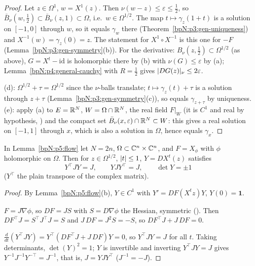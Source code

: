 \begin{proof}
\label{stepN:p5:fl-inverse} Let $z\in\Omega^1$, $w=X^1(z)$. Then $\nu(w-z)\le\varepsilon\le\frac12$, so $\bar B_\nu(w,\frac12)\subset\bar B_\nu(z,1)\subset\Omega$, i.e.\ $w\in\Omega^{1/2}$. The map $t\mapsto\gamma_z(1+t)$ is a solution on $[-1,0]$ through $w$, so it equals $\gamma_w$ there (Theorem~\ref{bpN:p3:gen-uniqueness}) and $X^{-1}(w)=\gamma_z(0)=z$. The statement for $X^1\circ X^{-1}$ is this one for $-F$ (Lemma~\ref{bpN:p3:gen-symmetry}(b)).
For the derivative: $B_\nu(z,\frac12)\subset\Omega^{1/2}$ (as above), $G=X^t-\mathrm{id}$ is holomorphic there by (b) with $\nu(G)\le\varepsilon$ by (a); Lemma~\ref{bpN:p4:general-cauchy} with $R=\frac12$ gives $\lvert DG(z)\rvert_\nu\le2\varepsilon$.

\label{stepN:p5:fl-symmetry} (d): $\Omega^{1/2}+\tau=\Omega^{1/2}$ since the $\nu$-balls translate; $t\mapsto\gamma_z(t)+\tau$ is a solution through $z+\tau$ (Lemma~\ref{bpN:p3:gen-symmetry}(c)), so equals $\gamma_{z+\tau}$ by uniqueness.
(e): apply (a) to $E=\mathbb{R}^N$, $W=\Omega\cap\mathbb{R}^N$, the real field $F|_W$ (it is $C^1$ and real by hypothesis, ) and the compact set $\bar B_\nu(x,\varepsilon)\cap\mathbb{R}^N\subset W$: this gives a real solution on $[-1,1]$ through $x$, which is also a solution in $\Omega$, hence equals $\gamma_x$.
\end{proof}

\begin{lemma}\label{bpN:p5:symplectic}
In Lemma~\ref{bpN:p5:flow} let $N=2n$, $\Omega\subset\mathbb{C}^n\times\mathbb{C}^n$, and $F=X_\phi$ with $\phi$ holomorphic on $\Omega$. Then for $z\in\Omega^{1/2}$, $\lvert t\rvert\le1$, $Y=D X^t(z)$ satisfies
\[Y^\top JY=J,\qquad YJY^\top=J,\qquad \det Y=\pm1\]
($Y^\top$ the plain transpose of the complex matrix).
\end{lemma}
\begin{proof}
\label{stepN:p5:sy-var} By Lemma~\ref{bpN:p5:flow}(b), $Y\in C^1$ with $Y'=DF(X^tz)Y$, $Y(0)=\mathbf 1$.

\label{stepN:p5:sy-field} $F=J\nabla\phi$, so $DF=JS$ with $S=D\nabla\phi$ the Hessian, symmetric (). Then $DF^\top J=S^\top J^\top J=S$ and $J\,DF=J^2S=-S$, so $DF^\top J+J\,DF=0$.

\label{stepN:p5:sy-conserve} $\frac d{dt}(Y^\top JY)=Y^\top(DF^\top J+J\,DF)Y=0$, so $Y^\top JY=J$ for all $t$. Taking determinants, $\det(Y)^2=1$; $Y$ is invertible and inverting $Y^\top JY=J$ gives $Y^{-1}J^{-1}Y^{-\top}=J^{-1}$, that is, $J=YJY^\top$ ($J^{-1}=-J$).
\end{proof}

